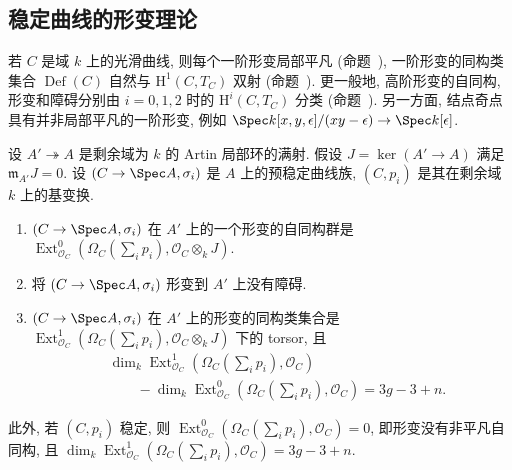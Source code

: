 \subsection{稳定曲线的形变理论}\label{src:6.3.5-subsection}
若 $C$ 是域 $k$ 上的光滑曲线, 则每个一阶形变局部平凡 (命题~), 一阶形变的同构类集合 $\operatorname{Def}(C)$ 自然与 $\mathrm H^1(C,\allowbreak T_C)$ 双射 (命题~). 更一般地, 高阶形变的自同构, 形变和障碍分别由 $i=0,\allowbreak 1,\allowbreak 2$ 时的 $\mathrm H^i(C,\allowbreak T_C)$ 分类 (命题~). 另一方面, 结点奇点具有并非局部平凡的一阶形变, 例如 $\Spec k[x,\allowbreak y,\allowbreak \epsilon]/(xy-\epsilon)\to\Spec k[\epsilon]$.
\begin{proposition}\label{src:6.3.26}
设 $A'\twoheadrightarrow A$ 是剩余域为 $k$ 的 Artin 局部环的满射. 假设 $J=\ker(A'\to\allowbreak A)$ 满足 $\mathfrak m_{A'}J=0$. 设 $(\mathcal C\to\Spec A,\allowbreak \sigma_i)$ 是 $A$ 上的预稳定曲线族, $(C,\allowbreak p_i)$ 是其在剩余域 $k$ 上的基变换.
\begin{enumerate}[(1)]
\item $(\mathcal C\to\Spec A,\allowbreak \sigma_i)$ 在 $A'$ 上的一个形变的自同构群是 $\operatorname{Ext}^0_{\mathcal O_C}(\Omega_C(\sum_i p_i),\allowbreak \mathcal O_C\otimes_k J)$.
\item 将 $(\mathcal C\to\Spec A,\allowbreak \sigma_i)$ 形变到 $A'$ 上没有障碍.
\item $(\mathcal C\to\Spec A,\allowbreak \sigma_i)$ 在 $A'$ 上的形变的同构类集合是 $\operatorname{Ext}^1_{\mathcal O_C}(\Omega_C(\sum_i p_i),\allowbreak \mathcal O_C\otimes_k J)$ 下的 torsor, 且
\[
\begin{aligned}
&\dim_k\operatorname{Ext}^1_{\mathcal O_C}(\Omega_C(\sum_i p_i),\mathcal O_C)\\
&\qquad-\dim_k\operatorname{Ext}^0_{\mathcal O_C}(\Omega_C(\sum_i p_i),\mathcal O_C)=3g-3+n.
\end{aligned}
\]
\end{enumerate}
此外, 若 $(C,\allowbreak p_i)$ 稳定, 则 $\operatorname{Ext}^0_{\mathcal O_C}(\Omega_C(\sum_i p_i),\allowbreak \mathcal O_C)=0$, 即形变没有非平凡自同构, 且 $\dim_k\operatorname{Ext}^1_{\mathcal O_C}(\Omega_C(\sum_i p_i),\allowbreak \mathcal O_C)=3g-3+n$.
\end{proposition}
